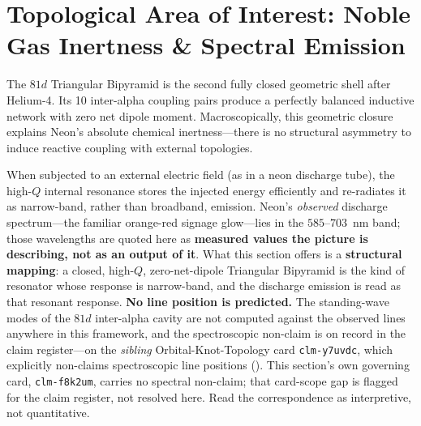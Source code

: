 \section{Topological Area of Interest: Noble Gas Inertness \& Spectral Emission}
The $81d$ Triangular Bipyramid is the second fully closed geometric shell after Helium-4. Its 10 inter-alpha coupling pairs produce a perfectly balanced inductive network with zero net dipole moment. Macroscopically, this geometric closure explains Neon's absolute chemical inertness---there is no structural asymmetry to induce reactive coupling with external topologies.

When subjected to an external electric field (as in a neon discharge tube), the high-$Q$ internal resonance stores the injected energy efficiently and re-radiates it as narrow-band, rather than broadband, emission. Neon's \emph{observed} discharge spectrum---the familiar orange-red signage glow---lies in the $585$--$703$~nm band; those wavelengths are quoted here as \textbf{measured values the picture is describing, not as an output of it}. What this section offers is a \textbf{structural mapping}: a closed, high-$Q$, zero-net-dipole Triangular Bipyramid is the kind of resonator whose response is narrow-band, and the discharge emission is read as that resonant response. \textbf{No line position is predicted.} The standing-wave modes of the $81d$ inter-alpha cavity are not computed against the observed lines anywhere in this framework, and the spectroscopic non-claim is on record in the claim register---on the \emph{sibling} Orbital-Knot-Topology card \texttt{clm-y7uvdc}, which explicitly non-claims spectroscopic line positions (). This section's own governing card, \texttt{clm-f8k2um}, carries no spectral non-claim; that card-scope gap is flagged for the claim register, not resolved here. Read the correspondence as interpretive, not quantitative.

